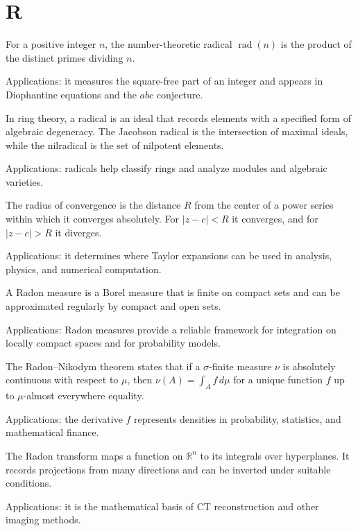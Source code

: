 \chapter*{R}
\label{chap:r}

For a positive integer $n$, the number-theoretic radical $\operatorname{rad}(n)$ is the product of the distinct primes dividing $n$. \par\noindent Applications: it measures the square-free part of an integer and appears in Diophantine equations and the $abc$ conjecture.

In ring theory, a radical is an ideal that records elements with a specified form of algebraic degeneracy. The Jacobson radical is the intersection of maximal ideals, while the nilradical is the set of nilpotent elements. \par\noindent Applications: radicals help classify rings and analyze modules and algebraic varieties.

The radius of convergence is the distance $R$ from the center of a power series within which it converges absolutely. For $|z-c|<R$ it converges, and for $|z-c|>R$ it diverges. \par\noindent Applications: it determines where Taylor expansions can be used in analysis, physics, and numerical computation.

A Radon measure is a Borel measure that is finite on compact sets and can be approximated regularly by compact and open sets. \par\noindent Applications: Radon measures provide a reliable framework for integration on locally compact spaces and for probability models.

The Radon--Nikodym theorem states that if a $\sigma$-finite measure $\nu$ is absolutely continuous with respect to $\mu$, then $\nu(A)=\int_A f\,d\mu$ for a unique function $f$ up to $\mu$-almost everywhere equality. \par\noindent Applications: the derivative $f$ represents densities in probability, statistics, and mathematical finance.

The Radon transform maps a function on $\mathbb R^n$ to its integrals over hyperplanes. It records projections from many directions and can be inverted under suitable conditions. \par\noindent Applications: it is the mathematical basis of CT reconstruction and other imaging methods.

